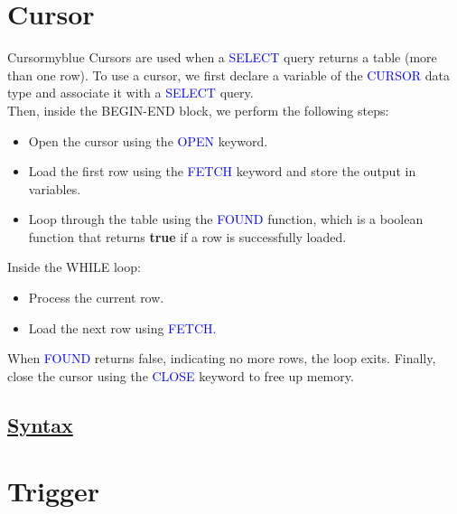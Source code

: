\newpage

\section{Cursor}
\begin{prettyBox}{Cursor}{myblue}
Cursors are used when a \textcolor{blue}{SELECT} query returns a table (more than one row).  
To use a cursor, we first declare a variable of the \textcolor{blue}{CURSOR} data type and associate it with a \textcolor{blue}{SELECT} query.\\[0.15cm]
Then, inside the BEGIN-END block, we perform the following steps:  

\begin{itemize}
    \item Open the cursor using the \textcolor{blue}{OPEN} keyword.  
    \item Load the first row using the \textcolor{blue}{FETCH} keyword and store the output in variables.  
    \item Loop through the table using the \textcolor{blue}{FOUND} function, which is a boolean function that returns \textbf{true} if a row is successfully loaded.  
\end{itemize}

Inside the WHILE loop: 
\begin{itemize}
    \item Process the current row.  
    \item Load the next row using \textcolor{blue}{FETCH}.  
\end{itemize}

When \textcolor{blue}{FOUND} returns false, indicating no more rows, the loop exits. Finally, close the cursor using the \textcolor{blue}{CLOSE} keyword to free up memory.  
\end{prettyBox}

\subsection*{\underline{Syntax}}




\section{Trigger}

